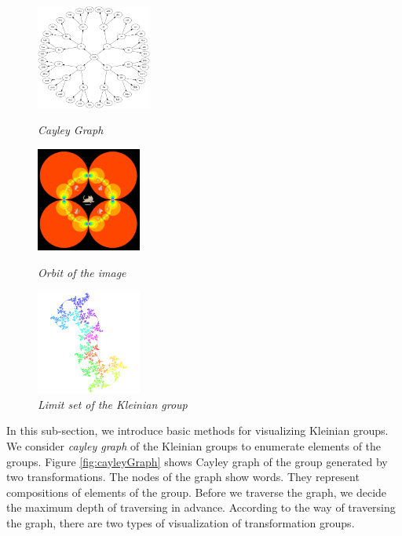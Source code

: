\begin{figure}[htbp]
 \begin{minipage}[t]{0.333\hsize}
  \center
  \includegraphics[height=1.35in, keepaspectratio]{img/cayleyGraph.png}
  \caption{\textit{Cayley Graph}}
  \label{fig:cayleyGraph}
  \hspace*{\fill}
 \end{minipage}
 \begin{minipage}[t]{0.333\hsize}
  \center
  \includegraphics[height=1.35in, keepaspectratio]{img/preparation/basic/catOrbit.png}
  \caption{\textit{Orbit of the image}}
  \label{fig:orbitCat}
  \hspace*{\fill}
 \end{minipage}
 \begin{minipage}[t]{0.333\hsize}
  \center
  \includegraphics[height=1.35in, keepaspectratio]{img/preparation/limitSet/limit.png}
  \caption{\textit{Limit set of the Kleinian group}}
  \label{fig:limit}
  \hspace*{\fill}
 \end{minipage}
\end{figure}

\noindent In this sub-section, we introduce basic methods for visualizing Kleinian groups.
We consider \textit{cayley graph} of the Kleinian groups to enumerate elements
of the groups.
Figure \ref{fig:cayleyGraph} shows Cayley graph of the group generated
by two transformations.
The nodes of the graph show words.
They represent compositions of elements of the group.
Before we traverse the graph, we decide the maximum depth of traversing in advance.
According to the way of traversing the graph, 
there are two types of visualization of transformation groups.

